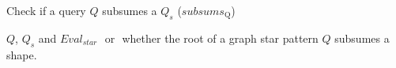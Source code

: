 \begin{algorithm}[h]
    \caption{Check if a query $Q$ subsumes a $Q_s$ ($subsums_{\mathrm{Q}}$)}\label{alg:containmentQuery}
    \begin{algorithmic}
        \scriptsize

        \REQUIRE  $Q$, $Q_s$ and $Eval_{star}$
        \ENSURE \TRUE $ $ or \FALSE $ $ whether the root of a graph star pattern $Q$ subsumes a shape.

                    \RETURN \TRUE
                \ENDIF
            \ENDFOR
        \ENDFOR
        \RETURN \FALSE
    \end{algorithmic}
\end{algorithm}